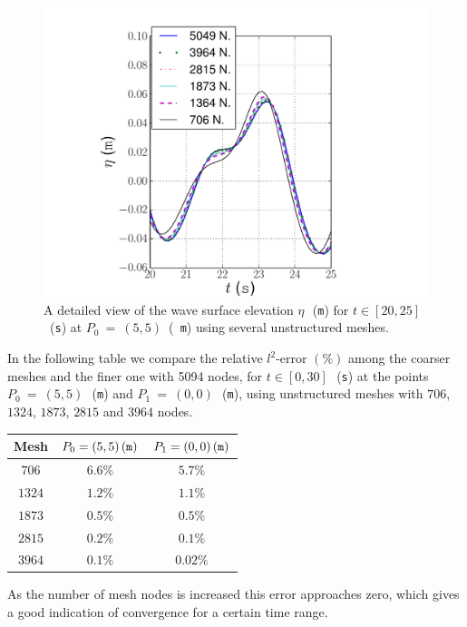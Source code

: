 \begin{figure}
  {\centering
    \includegraphics[width=\largefig]{chapters/lopes/pdf/detail_unstr.pdf}
    \caption{A detailed view of the wave surface elevation
      $\eta$\,~({\tt m}) for $t\in[20,25]$~({\tt s}) at $P_0~=~(5,5)$~({\tt
        m}) using several unstructured meshes.}\par}
  \label{fig:lopes:unstdetail}
\end{figure}

In the following table we compare the relative $l^2$-error $(\%)$
among the coarser meshes and the finer one with 5094 nodes, for
$t\in[0,30]$\,~({\tt s}) at the points $P_0~=~(5,5)$\,~({\tt m}) and
$P_1~=~(0,0)$\,~({\tt m}), using unstructured meshes with $706$,
$1324$, $1873$, $2815$ and $3964$ nodes.
\smallskip
\begin{center}
  \renewcommand{\arraystretch}{1.3}
  \begin{tabular}{|c|c|c|}
    \hline Mesh & $P_0=(5,5)\,({\tt m})$ & $P_1=(0,0)\,({\tt m})$\\ \hline
    $706$ &$6.6\%$ & $5.7\%$ \\
    \hline $1324$  &$1.2\%$    &$1.1\%$ \\
    \hline  $1873$ & $0.5\%$   & $0.5\%$ \\
    \hline $2815$ & $0.2\%$  &$0.1\%$  \\
    \hline $3964$ & $0.1\%$    &$0.02\%$\\ \hline
  \end{tabular}
\end{center}
\smallskip
As the number of mesh nodes is increased this error approaches zero,
which gives a good indication of convergence for a certain time range.

